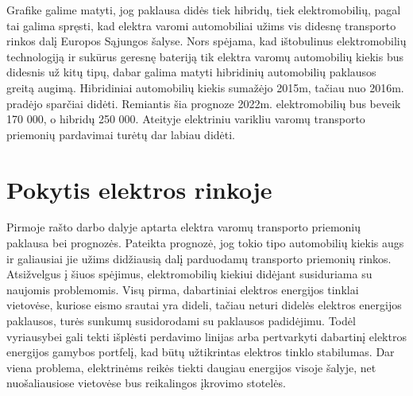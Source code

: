 \documentclass[12pt, titlepage]{article}
\begin{document}
Grafike galime matyti, jog paklausa didės tiek hibridų, tiek elektromobilių, pagal tai galima spręsti, kad elektra varomi automobiliai užims vis didesnę transporto rinkos dalį Europos Sąjungos šalyse. Nors spėjama, kad ištobulinus elektromobilių technologiją ir sukūrus geresnę bateriją tik elektra varomų automobilių kiekis bus didesnis už kitų tipų, dabar galima matyti hibridinių automobilių paklausos greitą augimą. Hibridiniai automobilių kiekis sumažėjo 2015m, tačiau nuo 2016m. pradėjo sparčiai didėti.  Remiantis šia prognoze 2022m. elektromobilių bus beveik 170 000, o hibridų 250 000. Ateityje elektriniu varikliu varomų transporto priemonių pardavimai turėtų dar labiau didėti.

\newpage
\section{Pokytis elektros rinkoje}

Pirmoje rašto darbo dalyje aptarta elektra varomų transporto priemonių paklausa bei prognozės. Pateikta prognozė, jog tokio tipo automobilių kiekis augs ir galiausiai jie užims didžiausią dalį parduodamų transporto priemonių rinkos. Atsižvelgus į šiuos spėjimus, elektromobilių kiekiui didėjant susiduriama su naujomis problemomis. 
Visų pirma, dabartiniai elektros energijos tinklai vietovėse, kuriose eismo srautai yra dideli, tačiau neturi didelės elektros energijos paklausos, turės sunkumų susidorodami su paklausos padidėjimu. Todėl vyriausybei gali tekti išplėsti perdavimo linijas arba pertvarkyti dabartinį elektros energijos gamybos portfelį, kad būtų užtikrintas elektros tinklo stabilumas.\parencite{moon2018forecasting}
Dar viena problema, elektrinėms reikės tiekti daugiau energijos visoje šalyje, net nuošaliausiose vietovėse bus reikalingos įkrovimo stotelės.
\end{document}
